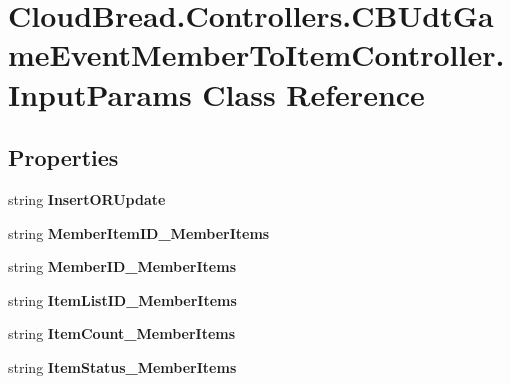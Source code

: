 \hypertarget{a00108}{}\section{Cloud\+Bread.\+Controllers.\+C\+B\+Udt\+Game\+Event\+Member\+To\+Item\+Controller.\+Input\+Params Class Reference}
\label{a00108}
\subsection*{Properties}
\begin{DoxyCompactItemize}
\item 
string {\bfseries Insert\+O\+R\+Update}\hypertarget{a00108_a5c4ea1fd9070ccc52ef0476c53ac6701}{}\label{a00108_a5c4ea1fd9070ccc52ef0476c53ac6701}

\item 
string {\bfseries Member\+Item\+I\+D\+\_\+\+Member\+Items}\hypertarget{a00108_a8f8febd9813a2f9aebc881123bb407c6}{}\label{a00108_a8f8febd9813a2f9aebc881123bb407c6}

\item 
string {\bfseries Member\+I\+D\+\_\+\+Member\+Items}\hypertarget{a00108_a3308eacc8baaf1116f543c0a6118fd7d}{}\label{a00108_a3308eacc8baaf1116f543c0a6118fd7d}

\item 
string {\bfseries Item\+List\+I\+D\+\_\+\+Member\+Items}\hypertarget{a00108_a3547f16d40f97c9aa545ae36dec5e364}{}\label{a00108_a3547f16d40f97c9aa545ae36dec5e364}

\item 
string {\bfseries Item\+Count\+\_\+\+Member\+Items}\hypertarget{a00108_a0dfeb47a3694b4e1f457b4c8c964e777}{}\label{a00108_a0dfeb47a3694b4e1f457b4c8c964e777}

\item 
string {\bfseries Item\+Status\+\_\+\+Member\+Items}\hypertarget{a00108_a1386a5374990769d9a7af7de0db33e70}{}\label{a00108_a1386a5374990769d9a7af7de0db33e70}


\end{DoxyCompactItemize}
